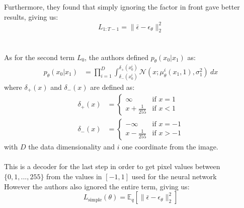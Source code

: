 \documentclass{article}
\begin{document}
Furthermore, they found that simply ignoring the factor in front gave better results, giving us:
\begin{equation}
  L_{1:T-1} = \| \bar{\epsilon} - \epsilon_\theta \|_2^2
\end{equation}
\\\\
As for the second term $L_0$, the authors defined $p_\theta(x_0 | x_1)$ as:
\begin{align}
  p_\theta(x_0 | x_1) &= \prod_{i=1}^{D} \int_{\delta_{-} (x_0^i)}^{\delta_{+} (x_0^i)} \mathcal{N}(x; \mu_\theta^i (x_1, 1), \sigma^2_1) \: dx
\end{align}
\hspace{0.5cm} where $\delta_{+} (x)$ and $\delta_{-} (x)$ are defined as:
\begin{align}
  \delta_{+} (x) &= \begin{cases}
    \infty & \text{if } x = 1 \\
    x + \frac{1}{255} & \text{if } x < 1 
  \end{cases}\\
  \delta_{-} (x) &= \begin{cases}
    - \infty & \text{if } x = - 1 \\
    x - \frac{1}{255} & \text{if } x > -1 
  \end{cases}
\end{align}
\hspace{0.5cm} with $D$ the data dimensionality and $i$ one coordinate from the image.
\\\\
This is a decoder for the last step in order to get pixel values between $\{0, 1, ..., 255 \}$ from the values in $[-1, 1]$ used for the neural network \cite{ho2020denoising,nichol2021improved} \\
However the authors also ignored the entire term, giving us:
\begin{equation}
  L_{\text{simple}}(\theta) = \mathbb{E}_q \left[ \| \bar{\epsilon} - \epsilon_\theta \|_2^2 \right]
\end{equation}
\end{document}
